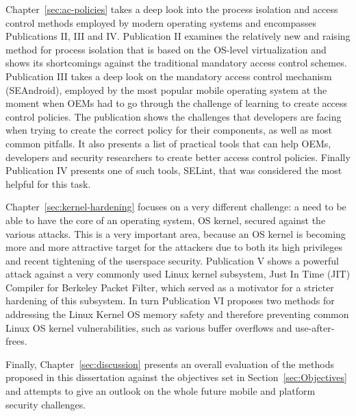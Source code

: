 Chapter~\ref{sec:ac-policies} takes a deep look into the process isolation and access control methods employed by modern operating systems and encompasses Publications II, III and IV. Publication II examines the relatively new and raising method for process isolation that is based on the OS-level virtualization and shows its shortcomings against the traditional mandatory access control schemes. Publication III takes a deep look on the mandatory access control mechanism (SEAndroid), employed by the most popular mobile operating system at the moment when OEMs had to go through the challenge of learning to create access control policies. The publication shows the challenges that developers are facing when trying to create the correct policy for their components, as well as most common pitfalls. It also presents a list of practical tools that can help OEMs, developers and security researchers to create better access control policies. Finally Publication IV presents one of such tools, SELint, that was considered the most helpful for this task. 

Chapter~\ref{sec:kernel-hardening} focuses on a very different challenge: a need to be able to have the core of an operating system, OS kernel, secured against the various attacks. This is a very important area, because an OS kernel is becoming more and more attractive target for the attackers due to both its high privileges and recent tightening of the userspace security. Publication V shows a powerful attack against a very commonly used Linux kernel subsystem, Just In Time (JIT) Compiler for Berkeley Packet Filter, which served as a motivator for a stricter hardening of this subsystem. In turn Publication VI proposes two methods for addressing the Linux Kernel OS memory safety and therefore preventing common Linux OS kernel vulnerabilities, such as various buffer overflows and use-after-frees. 

Finally, Chapter~\ref{sec:discussion} presents an overall evaluation of the methods proposed in this dissertation against the objectives set in Section~\ref{sec:Objectives} and attempts to give an outlook on the whole future mobile and platform security challenges. 

